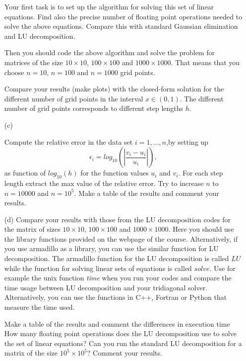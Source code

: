 \documentclass[11pt,a4wide]{article}
\begin{document}
\begin{enumerate}
Your first task is to set up the algorithm for solving this set of linear equations.
Find also the precise number of floating point 
operations needed to solve the above equations. 
Compare this with standard Gaussian elimination and LU decomposition.

Then you should code the above algorithm and solve the problem for matrices of the size
$10\times 10$, $100\times 100$ and $1000\times 1000$.  That means that you choose $n=10$, $n=100$ and
$n=1000$ grid points. 

Compare your results (make plots) with the closed-form solution for the different number of grid points  in the 
interval $x\in(0,1)$.  The different number of grid points corresponds to different step lengths $h$.

\item[(c)]

Compute the relative error  in the data set $i=1,\dots, n$,by setting up 
\[
   \epsilon_i=log_{10}\left(\left|\frac{v_i-u_i}
                 {u_i}\right|\right),
\]
as function of $log_{10}(h)$ for the function values $u_i$ and $v_i$.
For each step length extract the max value of the relative error.  
Try to increase $n$ to $n=10000$ and $n=10^5$.  Make a table of the results and 
comment your results. 

\item[(d)]
Compare your results with those from the LU decomposition codes for the matrix of sizes $10\times 10$, $100\times 100$ and
$1000\times 1000$. Here you should use the library functions provided  on the webpage of the course. Alternatively, if you use armadillo as a library, you can use the similar function for LU decomposition.  The armadillo function for the LU decomposition is called $LU$ while the function for solving linear sets of equations is called $solve$.
Use for example the unix function {\em time} when you run your codes 
and compare the time usage between LU decomposition and  your
tridiagonal solver.   Alternatively, you can use the functions in C++, Fortran or Python that measure the time used. 

Make a table of the results and comment the differences
in execution time
How many floating point operations does the LU decomposition use to solve the set of linear equations?
Can you run the standard LU decomposition
for a matrix of the size $10^5\times 10^5$?
Comment your results.



\end{enumerate}
\end{document}
